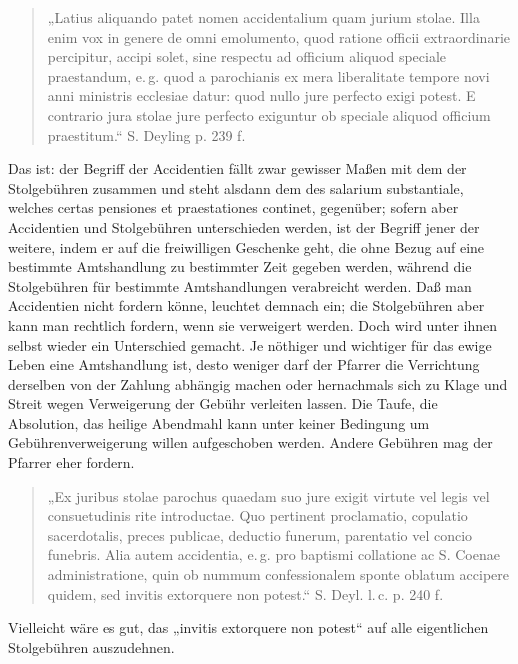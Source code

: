 \begin{quote}
„Latius aliquando patet nomen accidentalium quam jurium stolae. Illa enim vox in genere de omni
emolumento, quod ratione officii extraordinarie percipitur, accipi solet, sine respectu ad officium aliquod speciale praestandum, e.\,g. quod a parochianis ex mera liberalitate tempore novi anni ministris ecclesiae datur: quod nullo jure perfecto exigi potest. E contrario jura stolae jure perfecto exiguntur ob speciale aliquod officium praestitum.“ S. Deyling p. 239 f.
\end{quote}

Das ist: der Begriff der Accidentien fällt zwar gewisser Maßen mit dem der Stolgebühren zusammen und steht alsdann dem des salarium substantiale, welches certas pensiones et praestationes continet, gegenüber; sofern aber Accidentien und Stolgebühren unterschieden werden, ist der Begriff jener der weitere, indem er auf die freiwilligen Geschenke geht, die ohne Bezug auf eine bestimmte Amtshandlung zu bestimmter Zeit gegeben werden, während die Stolgebühren für bestimmte Amtshandlungen verabreicht werden. Daß man Accidentien nicht fordern könne, leuchtet demnach ein; die Stolgebühren aber kann man rechtlich fordern, wenn sie verweigert werden. Doch wird unter ihnen selbst wieder ein Unterschied gemacht. Je nöthiger und wichtiger für das ewige Leben eine Amtshandlung ist, desto weniger darf der Pfarrer die Verrichtung derselben von der Zahlung abhängig machen oder hernachmals sich zu Klage und Streit wegen Verweigerung der Gebühr verleiten lassen. Die Taufe, die Absolution, das heilige Abendmahl kann unter keiner Bedingung um Gebührenverweigerung willen aufgeschoben werden. Andere Gebühren mag der Pfarrer eher fordern.

\begin{quote}
„Ex juribus stolae parochus quaedam suo jure exigit virtute vel legis vel consuetudinis rite introductae.
Quo pertinent proclamatio, copulatio sacerdotalis, preces publicae, deductio funerum, parentatio vel concio funebris. Alia autem accidentia, e.\,g. pro baptismi collatione ac S. Coenae administratione, quin ob nummum confessionalem sponte oblatum accipere quidem, sed invitis extorquere non potest.“ S. Deyl. l.\,c. p. 240 f.
\end{quote}

Vielleicht wäre es gut, das „invitis extorquere non potest“ auf alle eigentlichen Stolgebühren auszudehnen.

